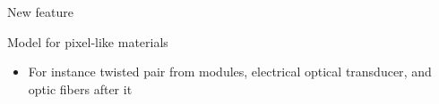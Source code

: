 \documentclass[pdftex, 11pt]{beamer}
\begin{document}
\begin{frame}{New feature}
  \begin{block}{Model for \alert{pixel-like} materials}
    \begin{itemize}
    \item For instance \alert{twisted pair} from modules, electrical optical \alert{transducer}, and \alert{optic fibers} after it
    \end{itemize}
  \end{block}
  \begin{center}
  \end{center}
\end{frame}
\end{document}

